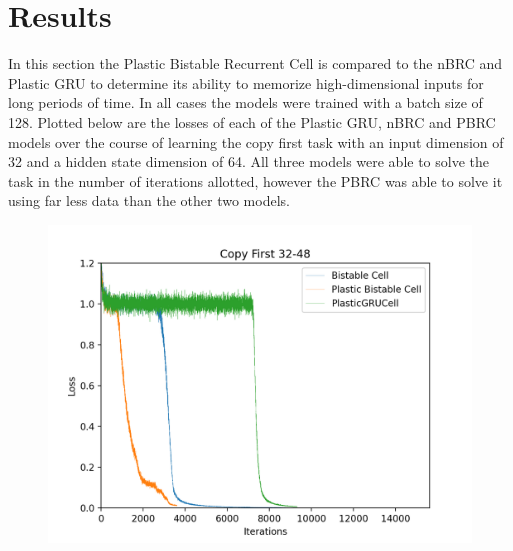 \section{Results}

In this section the Plastic Bistable Recurrent Cell is compared to the nBRC and Plastic GRU to determine its ability to memorize high-dimensional inputs for long periods of time. In all cases the models were trained with a batch size of 128.
Plotted below are the losses of each of the Plastic GRU, nBRC and PBRC models over the course of learning the copy first task with an input dimension of 32 and a hidden state dimension of 64. All three models were able to solve the task in the number of iterations allotted, however the PBRC was able to solve it using far less data than the other two models.

\begin{figure}[h]
	\centering
	\includegraphics[width=5in]{plots/32_64_plot}
\end{figure}

